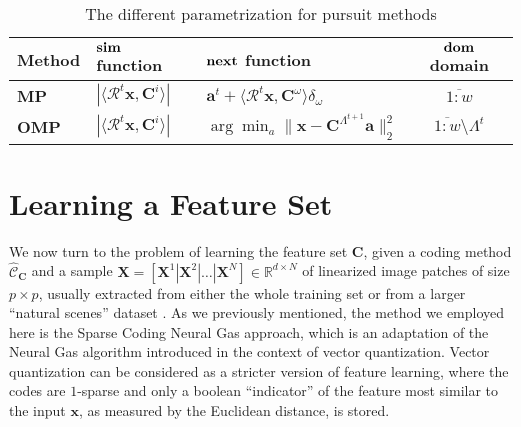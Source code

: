 \documentclass[runningheads,a4paper]{llncs}
\newcommand{\hctimes}[2]{{#1}\!\times\!{#2}}
\newcommand{\hcrange}[2]{\overline{{#1}\colon\!\!{#2}}}
\begin{document}
\renewcommand{\arraystretch}{1.5}
\begin{table}[h!]
  \caption{The different parametrization for pursuit methods}
  \label{table:PursuitParametrization}
  \begin{tabularx}{\textwidth}{|l|>{\centering}X|>{\centering}X|c|}
       \hline
        Method & $\text{\textbf{sim}}$ function & $\text{\textbf{next}}$ function & $\text{\textbf{dom}}$ domain\\ \hline \hline
        \textbf{MP} & $\left| \langle \mathcal{R}^t\textbf{x} , \textbf{C}^i \rangle \right|$ & $\textbf{a}^t + \langle \mathcal{R}^t\textbf{x} , \textbf{C}^\omega \rangle \delta_\omega$ & $\hcrange{1}{w}$ \\  \hline
        \textbf{OMP} & $\left| \langle \mathcal{R}^t\textbf{x} , \textbf{C}^i \rangle \right|$ & $\arg\min_{a} {\| \textbf{x} - \textbf{C}^{\Lambda^{t+1}}\textbf{a} \|_2^2}$ & $\hcrange{1}{w} \setminus \Lambda^t$ \\
       \hline
    \end{tabularx}
\end{table}
\renewcommand{\arraystretch}{1.0}

\section{Learning a Feature Set}

We now turn to the problem of learning the feature set $\textbf{C}$, given a coding method $\hat{\mathcal{C}}_\textbf{C}$ and a sample $\textbf{X} = \left[ \textbf{X}^1 \left|\right. \textbf{X}^2 \left|\right. \dots \left|\right. \textbf{X}^N \right] \in \mathbb{R}^{\hctimes{d}{N}}$ of linearized image patches of size $\hctimes{p}{p}$, usually extracted from either the whole training set or from a larger ``natural scenes'' dataset \cite{self-taught-learning}. As we previously mentioned, the method we employed here is the Sparse Coding Neural Gas approach, which is an adaptation of the Neural Gas algorithm introduced in the context of vector quantization. Vector quantization can be considered as a stricter version of feature learning, where the codes are $1$-sparse and only a boolean ``indicator'' of the feature most similar to the input $\textbf{x}$, as measured by the Euclidean distance, is stored.
\end{document}

